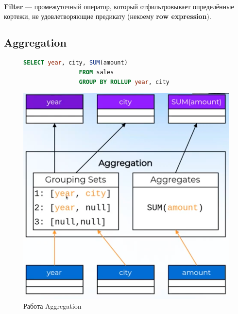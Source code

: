 \documentclass[11pt]{article}
\begin{document}
    \textbf{Filter} --- промежуточный оператор, который отфильтровывает определённые кортежи, не удовлетворяющие предикату (некоему \textbf{row expression}).

    \newpage

    \subsection{Aggregation}

    \begin{figure}[h!]
        \begin{minipage}{0.4\textwidth}
            \begin{lstlisting}[language=SQL, caption={SQL приводящий в Aggregation}]
                SELECT year, city, SUM(amount)
                FROM sales
                GROUP BY ROLLUP year, city
            \end{lstlisting}
        \end{minipage}
        \begin{minipage}{0.6\textwidth}
            \centering
            \includegraphics[width=\textwidth]{Pictures/Operators/Aggregation}
            \caption{Работа Aggregation}
        \end{minipage}
    \end{figure}
\end{document}
